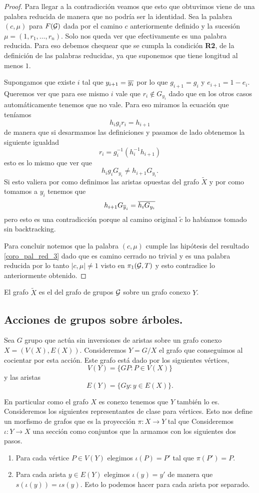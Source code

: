 \documentclass[tesis.tex]{subfiles}
\begin{document}
\begin{proof}
	Para llegar a la contradicción veamos que esto que obtuvimos viene de una palabra reducida de manera que no podría ser la identidad.
	Sea la palabra $(c, \mu)$ para $F({\cal G})$ dada por el camino $c$ anteriormente definido y la sucesión $\mu = (1,r_1, \dots, r_n)$.
	Solo nos queda ver que efectivamente es una palabra reducida. 
	Para eso debemos chequear que se cumpla la condición \textbf{R2}, de la definición de las palabras reducidas, ya que suponemos que tiene longitud al menos $1$.
	
	Supongamos que existe $i$ tal que $y_{i+1} = \overline{y_i}$ por lo que $g_{i+1} = g_{i}$ y $e_{i+1} = 1 - e_i$.
	Queremos ver que para ese mismo $i$ vale que $r_i \notin G_{y_i}$ dado que en los otros casos automáticamente tenemos que no vale.
	Para eso miramos la ecuación que teníamos 
	\[
		h_ig_ir_i = h_{i+1}
	\]
	de manera que si desarmamos las definiciones y pasamos de lado obtenemos la siguiente igualdad
	\[
		r_i =   g_i^{-1}(h_i^{-1} h_{i+1} )
	\]
	esto es lo mismo que ver que 
	\[
		h_ig_i G_{y_i} \neq  h_{i+1}G_{y_i}.
	\]
	Si esto valiera por como definimos las aristas opuestas del grafo $\tilde X$ y por como tomamos a $y_i$ tenemos que 
	\[
	h_{i+1}G_{\overline y_{i}} = \overline{h_{i}G_{y_i}}
	\]
	pero esto es una contradicción porque al camino original $\tilde c$ lo habíamos tomado sin backtracking.
	
	Para concluir notemos que la palabra $(c, \mu)$ cumple las hipótesis del resultado \ref{coro_pal_red_3} dado que es camino cerrado no trivial y es una palabra reducida por lo tanto $|c, \mu| \neq 1$ visto en $\pi_1({\cal G}, T)$ y esto contradice lo anteriormente obtenido.
\end{proof}


\begin{deff}
	El grafo $\tilde X$ es el  del grafo de grupos ${\cal G}$ sobre un grafo conexo $Y$.
\end{deff}
\subsection{Acciones de grupos sobre árboles.}

Sea $G$ grupo que actúa sin inversiones de aristas sobre un grafo conexo $X = (V(X),E(X))$.
Consideremos $Y = G / X$ el grafo que conseguimos al cocientar por esta acción.
Este grafo está dado por los siguientes vértices,
\[
	V(Y) = \{ G P :  P \in V(X)    \}
\]
y las  aristas 
\[
	E(Y) = \{  Gy  : y \in E(X)  \}.
\]

En particular como el grafo $X$ es conexo tenemos que $Y$ también lo es.
Consideremos los siguientes representantes de clase para vértices. 
Esto nos define un morfismo de grafos que es la proyección $\pi: X \to Y$ tal que
Consideremos $\iota: Y \to X$ una sección como conjuntos que la armamos con los siguientes dos pasos.
\begin{enumerate}
	\item Para cada vértice $P \in V(Y)$ elegimos $\iota (P) = P'$ tal que $\pi(P') = P$.
	\item Para cada arista $y \in E(Y)$ elegimos $\iota(y) = y'$ de manera que $s(\iota(y)) = \iota s(y)$. 
	Esto lo podemos hacer para cada arista por separado.
\end{enumerate}
\end{document}
